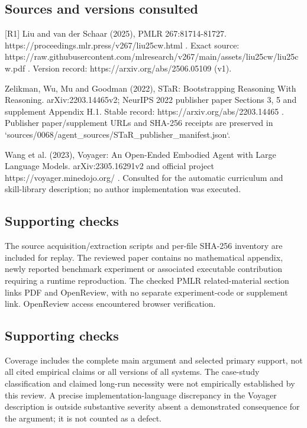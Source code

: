 \documentclass[10pt]{article}
\begin{document}
\subsection*{Sources and versions consulted}
[R1] Liu and van der Schaar (2025), PMLR 267:81714-81727. https://proceedings.mlr.press/v267/liu25cw.html . Exact source: https://raw.githubusercontent.com/mlresearch/v267/main/assets/liu25cw/liu25cw.pdf . Version record: https://arxiv.org/abs/2506.05109 (v1).\par
[R2] Zelikman, Wu, Mu and Goodman (2022), STaR: Bootstrapping Reasoning With Reasoning. arXiv:2203.14465v2; NeurIPS 2022 publisher paper Sections 3, 5 and supplement Appendix H.1. Stable record: https://arxiv.org/abs/2203.14465 . Publisher paper/supplement URLs and SHA-256 receipts are preserved in `sources/0068/agent\_sources/STaR\_publisher\_manifest.json`.\par
[R3] Wang et al. (2023), Voyager: An Open-Ended Embodied Agent with Large Language Models. arXiv:2305.16291v2 and official project https://voyager.minedojo.org/ . Consulted for the automatic curriculum and skill-library description; no author implementation was executed.\par
\subsection*{Supporting checks}
The source acquisition/extraction scripts and per-file SHA-256 inventory are included for replay. The reviewed paper contains no mathematical appendix, newly reported benchmark experiment or associated executable contribution requiring a runtime reproduction. The checked PMLR related-material section links PDF and OpenReview, with no separate experiment-code or supplement link. OpenReview access encountered browser verification.\par
\subsection*{Supporting checks}
Coverage includes the complete main argument and selected primary support, not all cited empirical claims or all versions of all systems. The case-study classification and claimed long-run necessity were not empirically established by this review. A precise implementation-language discrepancy in the Voyager description is outside substantive severity absent a demonstrated consequence for the argument; it is not counted as a defect.\par
\end{document}
